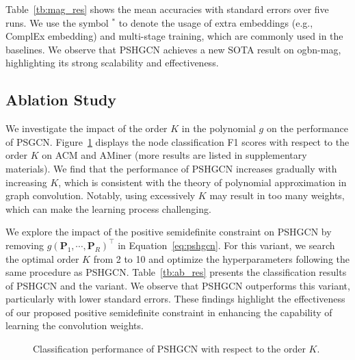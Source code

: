 \documentclass{article}
\begin{document}
Table~\ref{tb:mag_res} shows the mean accuracies with standard errors over five runs. We use the symbol $^{\ast}$ to denote the usage of extra embeddings (e.g., ComplEx embedding) and multi-stage training, which are commonly used in the baselines. We observe that PSHGCN achieves a new SOTA result on ogbn-mag, highlighting its strong scalability and effectiveness.


\subsection{Ablation Study}\label{se:ab}
We investigate the impact of the order $K$ in the polynomial $g$ on the performance of PSGCN. Figure~\ref{fig:f1-K} displays the node classification F1 scores with respect to the order $K$ on ACM and AMiner (more results are listed in supplementary materials). We find that the performance of PSHGCN increases gradually with increasing $K$, which is consistent with the theory of polynomial approximation in graph convolution. Notably, using excessively $K$ may result in too many weights, which can make the learning process challenging.

We explore the impact of the positive semidefinite constraint on PSHGCN by removing $g(\mathbf{P}_1,\cdots,\mathbf{P}_R)^{\top}$ in Equation~\eqref{eq:pshgcn}. For this variant, we search the optimal order $K$ from 2 to 10 and optimize the hyperparameters following the same procedure as PSHGCN. Table~\ref{tb:ab_res} presents the classification results of PSHGCN and the variant. We observe that PSHGCN outperforms this variant, particularly with lower standard errors. These findings highlight the effectiveness of our proposed positive semidefinite constraint in enhancing the capability of learning the convolution weights.


\begin{figure}[t]
    \centering
    \vspace{-6mm}
   \vspace{-2mm}
   \caption{Classification performance of PSHGCN with respect to the order $K$.}
   \vspace{-5mm}
   \label{fig:f1-K}
\end{figure}
\end{document}
